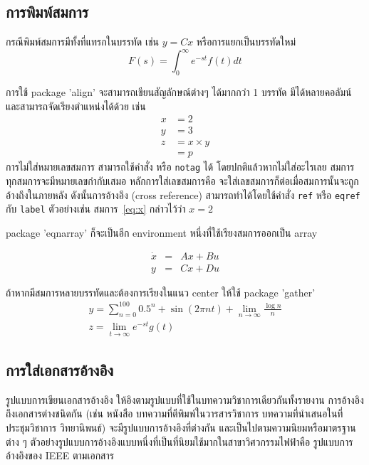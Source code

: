 \documentclass[11pt,a4paper]{article}
\begin{document}
\subsection{การพิมพ์สมการ}
กรณีพิมพ์สมการมีทั้งที่แทรกในบรรทัด เช่น $y=Cx$ หรือการแยกเป็นบรรทัดใหม่
\begin{equation}
    F(s) = \int_0^\infty e^{-st} f(t) dt
\end{equation}

การใช้ package 'align' จะสามารถเขียนสัญลักษณ์ต่างๆ ได้มากกว่า 1 บรรทัด มีได้หลายคอลัมน์ และสามารถจัดเรียงตำแหน่งได้ด้วย เช่น
\begin{align}
    x & = 2 \label{eq:x}       \\
    y & = 3 \label{eq:y}       \\
    z & = x \times y \nonumber \\
      & = p \label{eq:results}
\end{align}
การไม่ใส่หมายเลขสมการ สามารถใช้คำสั่ง \texttt{\nonumber} หรือ \texttt{notag} ได้ โดยปกติแล้วหากไม่ใส่อะไรเลย สมการทุกสมการจะมีหมายเลขกำกับเสมอ หลักการใส่เลขสมการคือ จะใส่เลขสมการก็ต่อเมื่อสมการนั้นจะถูกอ้างถึงในภายหลัง ดังนั้นการอ้างอึง (cross reference) สามารถทำได้โดยใช้คำสั่ง \texttt{ref} หรือ \texttt{eqref} กับ \texttt{label} ตัวอย่างเช่น สมการ~\eqref{eq:x} กล่าวไว้ว่า $x=2$

package 'eqnarray' ก็จะเป็นอีก environment หนึ่งที่ใช้เรียงสมการออกเป็น array

\begin{eqnarray}
    \dot{x} &=& Ax + Bu \\
    y &=& Cx+Du
\end{eqnarray}

ถ้าหากมีสมการหลายบรรทัดและต้องการเรียงในแนว center ให้ใช้ package 'gather'
\begin{gather}
    y = \sum_{n=0}^100 0.5^n + \sin(2\pi n t) + \lim_{n \rightarrow \infty} \frac{\log n}{n} \\
    z = \lim_{t \rightarrow \infty} e^{-st} g(t)
\end{gather}

\subsection{การใส่เอกสารอ้างอิง}
รูปแบบการเขียนเอกสารอ้างอิง ให้อิงตามรูปแบบที่ใช้ในบทความวิชาการเดียวกันทั้งรายงาน การอ้างอิงถึงเอกสารต่างชนิดกัน (เช่น หนังสือ บทความที่ตีพิมพ์ในวารสารวิชาการ บทความที่นำเสนอในที่ประชุมวิชาการ วิทยานิพนธ์) จะมีรูปแบบการอ้างอิงที่ต่างกัน และเป็นไปตามความนิยมหรือมาตรฐานต่าง ๆ ตัวอย่างรูปแบบการอ้างอิงแบบหนึ่งที่เป็นที่นิยมใช้มากในสาขาวิศวกรรมไฟฟ้าคือ รูปแบบการอ้างอิงของ IEEE ตามเอกสาร
\end{document}
